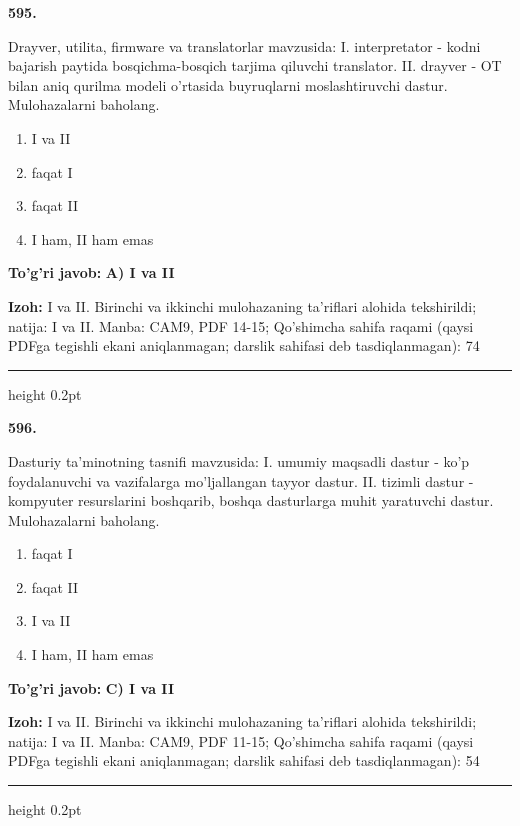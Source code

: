 \documentclass[10pt,a4paper]{article}
\begin{document}
{\bfseries\sffamily\color{ink} 595.}
\par
Drayver, utilita, firmware va translatorlar mavzusida: I. interpretator - kodni bajarish paytida bosqichma-bosqich tarjima qiluvchi translator. II. drayver - OT bilan aniq qurilma modeli o'rtasida buyruqlarni moslashtiruvchi dastur. Mulohazalarni baholang.
\begin{enumerate}[label=\Alph*),leftmargin=9mm]
\item I va II
\item faqat I
\item faqat II
\item I ham, II ham emas
\end{enumerate}
\begin{tcolorbox}[enhanced,breakable,colback=teal!4,colframe=teal!60!black,boxrule=0.45pt,arc=1.2mm,left=2.7mm,right=2.7mm,top=1.8mm,bottom=1.8mm,before skip=2mm,after skip=2mm]
{\bfseries\sffamily\color{teal}To'g'ri javob:} \textbf{A) I va II}
\par\smallskip
{\bfseries Izoh:} I va II. Birinchi va ikkinchi mulohazaning ta'riflari alohida tekshirildi; natija: I va II. Manba: CAM9, PDF 14-15; Qo'shimcha sahifa raqami (qaysi PDFga tegishli ekani aniqlanmagan; darslik sahifasi deb tasdiqlanmagan): 74
\end{tcolorbox}
\vspace{2mm}\hrule height 0.2pt\vspace{3mm}

{\bfseries\sffamily\color{ink} 596.}
\par
Dasturiy ta'minotning tasnifi mavzusida: I. umumiy maqsadli dastur - ko'p foydalanuvchi va vazifalarga mo'ljallangan tayyor dastur. II. tizimli dastur - kompyuter resurslarini boshqarib, boshqa dasturlarga muhit yaratuvchi dastur. Mulohazalarni baholang.
\begin{enumerate}[label=\Alph*),leftmargin=9mm]
\item faqat I
\item faqat II
\item I va II
\item I ham, II ham emas
\end{enumerate}
\begin{tcolorbox}[enhanced,breakable,colback=teal!4,colframe=teal!60!black,boxrule=0.45pt,arc=1.2mm,left=2.7mm,right=2.7mm,top=1.8mm,bottom=1.8mm,before skip=2mm,after skip=2mm]
{\bfseries\sffamily\color{teal}To'g'ri javob:} \textbf{C) I va II}
\par\smallskip
{\bfseries Izoh:} I va II. Birinchi va ikkinchi mulohazaning ta'riflari alohida tekshirildi; natija: I va II. Manba: CAM9, PDF 11-15; Qo'shimcha sahifa raqami (qaysi PDFga tegishli ekani aniqlanmagan; darslik sahifasi deb tasdiqlanmagan): 54
\end{tcolorbox}
\vspace{2mm}\hrule height 0.2pt\vspace{3mm}
\end{document}
